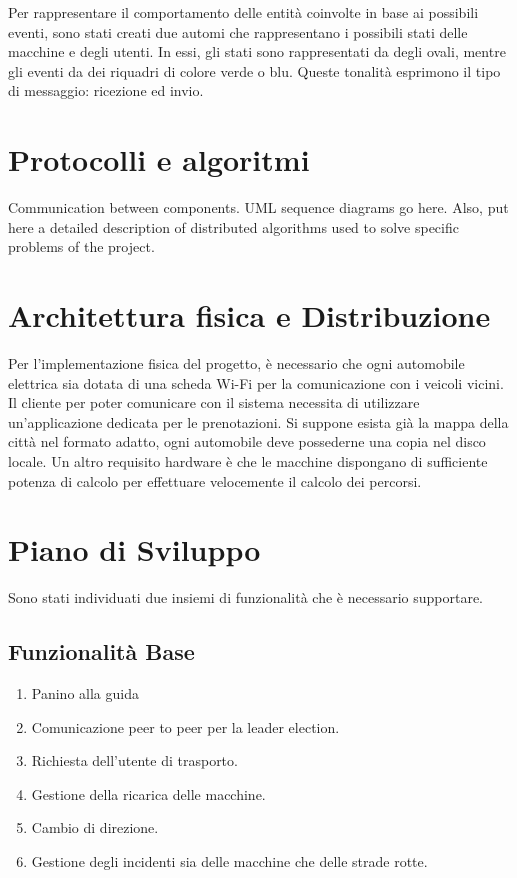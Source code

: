 Per rappresentare il comportamento delle entità coinvolte in base ai possibili eventi, sono stati creati due automi che rappresentano i possibili stati delle macchine e degli utenti. In essi, gli stati sono rappresentati da degli ovali, mentre gli eventi da dei riquadri di colore verde o blu. Queste tonalità esprimono il tipo di messaggio: ricezione ed invio.

\section{Protocolli e algoritmi}
Communication between components. UML sequence diagrams go here. Also, put here a detailed description of distributed algorithms used to solve specific problems of the project.

\section{Architettura fisica e Distribuzione}
Per l'implementazione fisica del progetto, è necessario che ogni automobile elettrica sia dotata di una scheda Wi-Fi per la comunicazione con i veicoli vicini. Il cliente per poter comunicare con il sistema necessita di utilizzare un'applicazione dedicata per le prenotazioni. Si suppone esista già la mappa della città nel formato adatto, ogni automobile deve possederne una copia nel disco locale. Un altro requisito hardware è che le macchine dispongano di sufficiente potenza di calcolo per effettuare velocemente il calcolo dei percorsi.


\section{Piano di Sviluppo}

Sono stati individuati due insiemi di funzionalità che è necessario supportare.
\subsection{Funzionalità Base}
\begin{enumerate}
	\item Panino alla guida
	\item Comunicazione peer to peer per la leader election.
	\item Richiesta dell'utente di trasporto.
	\item Gestione della ricarica delle macchine.
	\item Cambio di direzione.
	\item Gestione degli incidenti sia delle macchine che delle strade rotte.
\end{enumerate}

